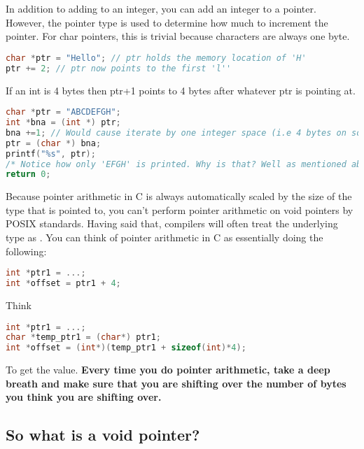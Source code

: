 In addition to adding to an integer, you can add an integer to a pointer.
However, the pointer type is used to determine how much to increment the pointer.
For char pointers, this is trivial because characters are always one byte.

\begin{lstlisting}[language=C]
char *ptr = "Hello"; // ptr holds the memory location of 'H'
ptr += 2; // ptr now points to the first 'l''
\end{lstlisting}

If an int is 4 bytes then ptr+1 points to 4 bytes after whatever ptr is pointing at.

\begin{lstlisting}[language=C]
char *ptr = "ABCDEFGH";
int *bna = (int *) ptr;
bna +=1; // Would cause iterate by one integer space (i.e 4 bytes on some systems)
ptr = (char *) bna;
printf("%s", ptr);
/* Notice how only 'EFGH' is printed. Why is that? Well as mentioned above, when performing 'bna+=1' we are increasing the **integer** pointer by 1, (translates to 4 bytes on most systems) which is equivalent to 4 characters (each character is only 1 byte)*/
return 0;
\end{lstlisting}

Because pointer arithmetic in C is always automatically scaled by the size of the type that is pointed to, you can't perform pointer arithmetic on void pointers by POSIX standards. Having said that, compilers will often treat the underlying type as .
You can think of pointer arithmetic in C as essentially doing the following:

\begin{lstlisting}[language=C]
int *ptr1 = ...;
int *offset = ptr1 + 4;
\end{lstlisting}

Think

\begin{lstlisting}[language=C]
int *ptr1 = ...;
char *temp_ptr1 = (char*) ptr1;
int *offset = (int*)(temp_ptr1 + sizeof(int)*4);
\end{lstlisting}

To get the value. \textbf{Every time you do pointer arithmetic, take a deep breath and make sure that you are shifting over the number of bytes you think you are shifting over.}

\subsection{So what is a void pointer?}

